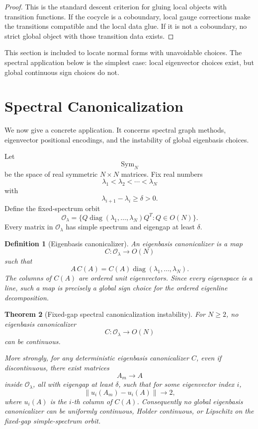 \documentclass[11pt]{article}
\newtheorem{theorem}{Theorem}[section]
\newtheorem{definition}[theorem]{Definition}
\DeclareMathOperator{\Sym}{Sym}
\begin{document}
\begin{proof}
This is the standard descent criterion for gluing local objects with transition functions. If the cocycle is a coboundary, local gauge corrections make the transitions compatible and the local data glue. If it is not a coboundary, no strict global object with those transition data exists.
\end{proof}

This section is included to locate normal forms with unavoidable choices. The spectral application below is the simplest case: local eigenvector choices exist, but global continuous sign choices do not.

\section{Spectral Canonicalization}

We now give a concrete application. It concerns spectral graph methods, eigenvector positional encodings, and the instability of global eigenbasis choices.

Let
\[
\Sym_N
\]
be the space of real symmetric \(N\times N\) matrices. Fix real numbers
\[
\lambda_1<\lambda_2<\cdots<\lambda_N
\]
with
\[
\lambda_{i+1}-\lambda_i\geq\delta>0.
\]
Define the fixed-spectrum orbit
\[
\mathcal O_\lambda
=
\{Q\operatorname{diag}(\lambda_1,\ldots,\lambda_N)Q^T:Q\in O(N)\}.
\]
Every matrix in \(\mathcal O_\lambda\) has simple spectrum and eigengap at least \(\delta\).

\begin{definition}[Eigenbasis canonicalizer]
An eigenbasis canonicalizer is a map
\[
C:\mathcal O_\lambda\to O(N)
\]
such that
\[
A\,C(A)=C(A)\operatorname{diag}(\lambda_1,\ldots,\lambda_N).
\]
The columns of \(C(A)\) are ordered unit eigenvectors. Since every eigenspace is a line, such a map is precisely a global sign choice for the ordered eigenline decomposition.
\end{definition}

\begin{theorem}[Fixed-gap spectral canonicalization instability]
For \(N\geq2\), no eigenbasis canonicalizer
\[
C:\mathcal O_\lambda\to O(N)
\]
can be continuous.

More strongly, for any deterministic eigenbasis canonicalizer \(C\), even if discontinuous, there exist matrices
\[
A_m\to A
\]
inside \(\mathcal O_\lambda\), all with eigengap at least \(\delta\), such that for some eigenvector index \(i\),
\[
\|u_i(A_m)-u_i(A)\|\to 2,
\]
where \(u_i(A)\) is the \(i\)-th column of \(C(A)\). Consequently no global eigenbasis canonicalizer can be uniformly continuous, Holder continuous, or Lipschitz on the fixed-gap simple-spectrum orbit.
\end{theorem}
\end{document}
